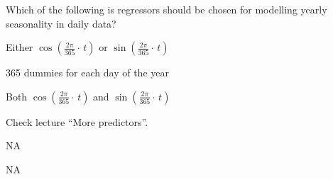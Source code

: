 
\begin{question}
Which of the following is regressors should be chosen for modelling yearly seasonality in daily data?
\begin{answerlist}
  \item Either \(\operatorname{cos}\left({\frac{2\pi}{365}}\cdot\,t\right)\) or \(\operatorname{sin}\left({\frac{2\pi}{365}}\cdot\,t\right)\)
  \item 365 dummies for each day of the year
  \item Both \(\operatorname{cos}\left({\frac{2\pi}{365}}\cdot\,t\right)\) and \(\operatorname{sin}\left({\frac{2\pi}{365}}\cdot\,t\right)\)
\end{answerlist}
\end{question}

\begin{solution}
\begin{answerlist}
  \item Check lecture ``More predictors''.
  \item NA
  \item NA
\end{answerlist}
\end{solution}

